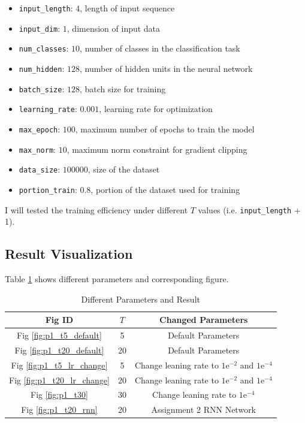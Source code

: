 \documentclass{article}
\begin{document}
\begin{itemize}
    \item \texttt{input\_length}: $4$, length of input sequence
    \item \texttt{input\_dim}: $1$, dimension of input data
    \item \texttt{num\_classes}: $10$, number of classes in the classification task
    \item \texttt{num\_hidden}: $128$, number of hidden units in the neural network
    \item \texttt{batch\_size}: $128$, batch size for training
    \item \texttt{learning\_rate}: $0.001$, learning rate for optimization
    \item \texttt{max\_epoch}: $100$, maximum number of epochs to train the model
    \item \texttt{max\_norm}: $10$, maximum norm constraint for gradient clipping
    \item \texttt{data\_size}: $100000$, size of the dataset
    \item \texttt{portion\_train}: $0.8$, portion of the dataset used for training
\end{itemize}

I will tested the training efficiency under different $T$ values (i.e. \texttt{input\_length} + 1).

\subsection{Result Visualization}

Table \ref{tab:p1_res_para} shows different parameters and corresponding figure.

\begin{table}[!h]
\centering\caption{Different Parameters and Result}
\label{tab:p1_res_para}
\begin{tabular}{|c|c|c|}
\hline
\textbf{Fig ID} & $T$ & \textbf{Changed Parameters} \\
\hline
Fig \ref{fig:p1_t5_default} & 5 & Default Parameters \\ \hline
Fig \ref{fig:p1_t20_default} & 20 & Default Parameters \\ \hline
Fig \ref{fig:p1_t5_lr_change} & 5 & Change leaning rate to $1\mathrm{e}^{-2}$ and $1\mathrm{e}^{-4}$ \\ \hline
Fig \ref{fig:p1_t20_lr_change} & 20 & Change leaning rate to $1\mathrm{e}^{-2}$ and $1\mathrm{e}^{-4}$ \\ \hline
Fig \ref{fig:p1_t30} & 30 & Change leaning rate to $1\mathrm{e}^{-4}$ \\ \hline
Fig \ref{fig:p1_t20_rnn} & 20 & Assignment 2 RNN Network \\ \hline
\end{tabular}
\end{table}
\end{document}
